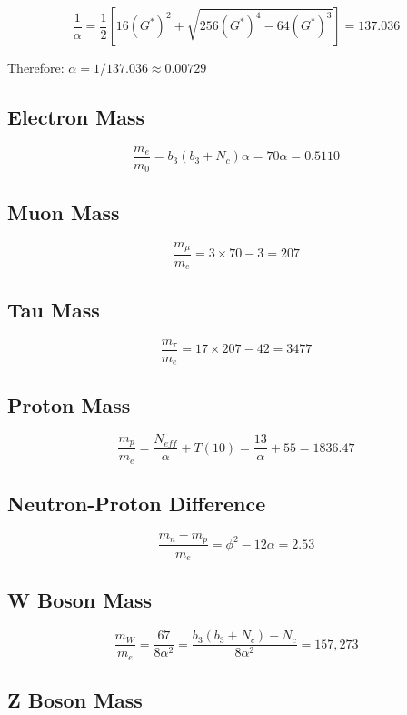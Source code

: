\documentclass[
  11pt,
  letterpaper,
  twoside,
  openany]{book}
\makeatletter
\let\orig@subsection\subsection
\renewcommand{\subsection}{\needspace{6\baselineskip}\orig@subsection}
\makeatother
\begin{document}
\[
\frac{1}{\alpha} = \frac{1}{2}\left[16(G^*)^2 + \sqrt{256(G^*)^4 - 64(G^*)^3}\right] = 137.036
\]

Therefore: \(\alpha = 1/137.036 \approx 0.00729\)

\subsection{Electron Mass}\label{electron-mass}

\[
\frac{m_e}{m_0} = b_3(b_3 + N_c)\alpha = 70\alpha = 0.5110
\]

\subsection{Muon Mass}\label{muon-mass}

\[
\frac{m_\mu}{m_e} = 3 \times 70 - 3 = 207
\]

\subsection{Tau Mass}\label{tau-mass}

\[
\frac{m_\tau}{m_e} = 17 \times 207 - 42 = 3477
\]

\subsection{Proton Mass}\label{proton-mass}

\[
\frac{m_p}{m_e} = \frac{N_{eff}}{\alpha} + T(10) = \frac{13}{\alpha} + 55 = 1836.47
\]

\subsection{Neutron-Proton Difference}\label{neutron-proton-difference}

\[
\frac{m_n - m_p}{m_e} = \phi^2 - 12\alpha = 2.53
\]

\subsection{W Boson Mass}\label{w-boson-mass}

\[
\frac{m_W}{m_e} = \frac{67}{8\alpha^2} = \frac{b_3(b_3+N_c) - N_c}{8\alpha^2} = 157{,}273
\]

\subsection{Z Boson Mass}\label{z-boson-mass}
\end{document}
